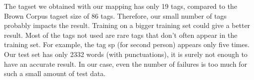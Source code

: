 The tagset we obtained with our mapping has only 19 tags, compared to the Brown Corpus tagset size of 86 tags. Therefore, our small number of tags probably impacts the result.
Training on a bigger training set could give a better result. Most of the tags not used are rare tags that don't often appear in the training set. For example, the tag sp (for second person) appears only five times.\\
Our test set has only 2332 words (with punctuations), it is surely not enough to have an accurate result. In our case, even the number of failures is too  much for such a small amount of test data.